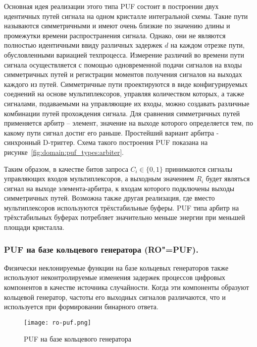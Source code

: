 \begin{enumerate}
Основная идея реализации этого типа PUF состоит в построении двух идентичных путей сигнала на одном кристалле интегральной схемы. Такие пути называются симметричными и имеют очень близкие по значению длины и промежутки времени распространения сигнала. Однако, они не являются полностью идентичными ввиду различных задержек $d$ на каждом отрезке пути, обусловленными вариацией техпроцесса. Измерение различий во времени пути сигнала осуществляется с помощью одновременной подачи сигналов на входы симметричных путей и регистрации моментов получения сигналов на выходах каждого из путей. Симметричные пути проектируются в виде конфигурируемых соеднений на основе мультиплексоров, управляя количеством которых, а также сигналами, подаваемыми на управляющие их входы, можно создавать различные комбинации путей прохождения сигнала. Для сравнения симметричных путей применяется арбитр -- элемент, значение на выходе которого определяется тем, по какому пути сигнал достиг его раньше. Простейший вариант арбитра - синхронный D-триггер. Схема такого построения PUF показана на рисунке~\ref{fig:domain:puf_types:arbiter}.

Таким образом, в качестве битов запроса $C_i \in \{0,1\} $ принимаются сигналы управляющих входов мультиплексоров, а выходным значением $R_i$ будет являться сигнал на выходе элемента-арбитра, к входам которого подключены выходы симметричных путей. Возможна также другая реализация, где вместо мультиплексоров используются трёхстабильные буферы. PUF типа арбитр на трёхстабильных буферах потребляет значительно меньше энергии при меньшей площади кристалла.

\subsubsection{PUF на базе кольцевого генератора (RO"=PUF). }
\label{sub:domain:puf_types:ring_oscillator}

Физически неклонируемые функции на базе кольцевых генераторов также используют неконтролируемые изменения задержек процессов цифровых компонентов в качестве источника случайности. Когда эти компоненты образуют кольцевой генератор, частоты его выходных сигналов различаются, что и используется при формировании бинарного ответа.

\begin{figure}[ht]
    \centering
    \texttt{[image: ro-puf.png]}
    \caption{PUF на базе кольцевого генератора}
    \label{fig:domain:puf_types:ring_oscillator}
\end{figure}


\end{enumerate}
